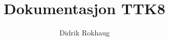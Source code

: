 \documentclass[a4 paper]{article}
\begin{document}
    \title{Dokumentasjon TTK8}
    \author{Didrik Rokhaug}
    \maketitle

    
    
    
    
    
    
    

    \appendix
    
\end{document}
